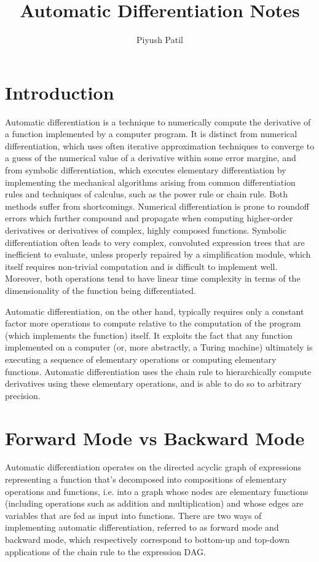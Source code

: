 \documentclass{article}
\begin{document}
\title{Automatic Differentiation Notes}
\author{Piyush Patil}
\maketitle

\section{Introduction}
Automatic differentiation is a technique to numerically compute the derivative of a function implemented by a computer program. It is distinct from numerical differentiation, which uses often iterative approximation techniques to converge to a guess of the numerical value of a derivative within some error margine, and from symbolic differentiation, which executes elementary differentiation by implementing the mechanical algorithms arising from common differentiation rules and techniques of calculus, such as the power rule or chain rule. Both methods suffer from shortcomings. Numerical differentiation is prone to roundoff errors which further compound and propagate when computing higher-order derivatives or derivatives of complex, highly composed functions. Symbolic differentiation often leads to very complex, convoluted expression trees that are inefficient to evaluate, unless properly repaired by a simplification module, which itself requires non-trivial computation and is difficult to implement well. Moreover, both operations tend to have linear time complexity in terms of the dimensionality of the function being differentiated.

Automatic differentiation, on the other hand, typically requires only a constant factor more operations to compute relative to the computation of the program (which implements the function) itself. It exploits the fact that any function implemented on a computer (or, more abstractly, a Turing machine) ultimately is executing a sequence of elementary operations or computing elementary functions. Automatic differentiation uses the chain rule to hierarchically compute derivatives using these elementary operations, and is able to do so to arbitrary precision.

\section{Forward Mode vs Backward Mode}
Automatic differentiation operates on the directed acyclic graph of expressions representing a function that's decomposed into compositions of elementary operations and functions, i.e. into a graph whose nodes are elementary functions (including operations such as addition and multiplication) and whose edges are variables that are fed as input into functions. There are two ways of implementing automatic differentiation, referred to as forward mode and backward mode, which respectively correspond to bottom-up and top-down applications of the chain rule to the expression DAG.
\end{document}
